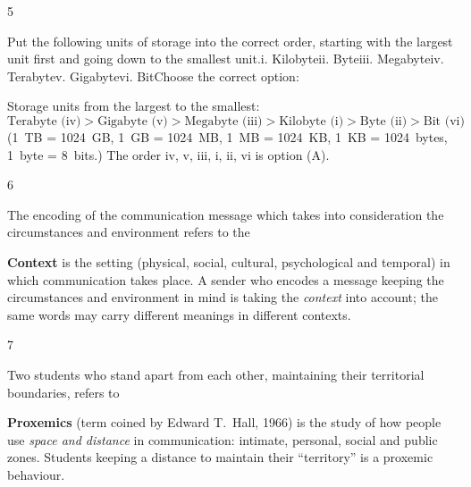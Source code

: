 \begin{question}{5}
{Put the following units of storage into the correct order, starting with the largest unit first and going down to the smallest unit.\newline i. Kilobyte\newline ii. Byte\newline iii. Megabyte\newline iv. Terabyte\newline v. Gigabyte\newline vi. Bit\newline Choose the correct option:\par}
\begin{explain}
Storage units from the largest to the smallest:
\[\text{Terabyte (iv)} > \text{Gigabyte (v)} > \text{Megabyte (iii)} > \text{Kilobyte (i)} > \text{Byte (ii)} > \text{Bit (vi)}\]
(1~TB = 1024~GB, 1~GB = 1024~MB, 1~MB = 1024~KB, 1~KB = 1024~bytes, 1~byte = 8~bits.) The order iv, v, iii, i, ii, vi is option (A).
\end{explain}
\end{question}

\begin{question}{6}
{The encoding of the communication message which takes into consideration the circumstances and environment refers to the\par}
\begin{explain}
\textbf{Context} is the setting (physical, social, cultural, psychological and temporal) in which communication takes place. A sender who encodes a message keeping the circumstances and environment in mind is taking the \emph{context} into account; the same words may carry different meanings in different contexts.
\end{explain}
\end{question}

\begin{question}{7}
{Two students who stand apart from each other, maintaining their territorial boundaries, refers to\par}
\begin{explain}
\textbf{Proxemics} (term coined by Edward T.~Hall, 1966) is the study of how people use \emph{space and distance} in communication: intimate, personal, social and public zones. Students keeping a distance to maintain their ``territory'' is a proxemic behaviour.
\end{explain}
\end{question}

